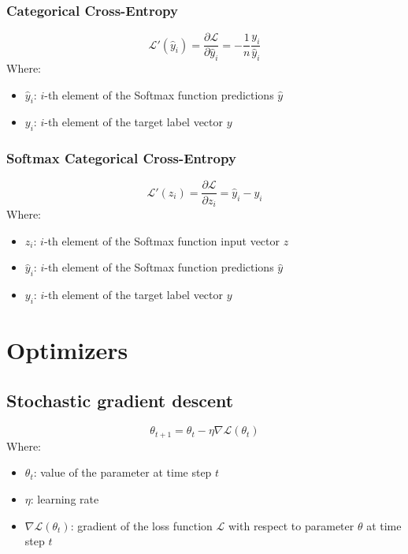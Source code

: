 \documentclass[a4paper]{report}
\newcommand{\haty}{\hat{y}}
\newcommand{\ELL}{\mathcal{L}}
\begin{document}
\subsubsection*{Categorical Cross-Entropy}
\begin{equation*}
    \ELL'(\haty_i) = \frac{\partial\ELL}{\partial \haty_i} = -\frac{1}{n}\frac{y_i}{\haty_i}
\end{equation*}
Where:
\begin{itemize}
    \item $\haty_i$: $i$-th element of the Softmax function predictions $\haty$
    \item $y_i$: $i$-th element of the target label vector $y$
\end{itemize}

\subsubsection*{Softmax Categorical Cross-Entropy}
\begin{equation*}
    \ELL'(z_i) = \frac{\partial\ELL}{\partial z_i} = \haty_i - y_i
\end{equation*}
Where:
\begin{itemize}
    \item $z_i$: $i$-th element of the Softmax function input vector $z$
    \item $\haty_i$: $i$-th element of the Softmax function predictions $\haty$
    \item $y_i$: $i$-th element of the target label vector $y$
\end{itemize}

\section{Optimizers}

\subsection{Stochastic gradient descent}
\begin{equation*}
    \theta_{t+1} = \theta_t - \eta \nabla\ELL(\theta_t)
\end{equation*}
Where:
\begin{itemize}
    \item $\theta_t$: value of the parameter at time step $t$
    \item $\eta$: learning rate
    \item $\nabla\ELL(\theta_t)$: gradient of the loss function $\ELL$ with respect to parameter $\theta$ at time step $t$
\end{itemize}
\end{document}
